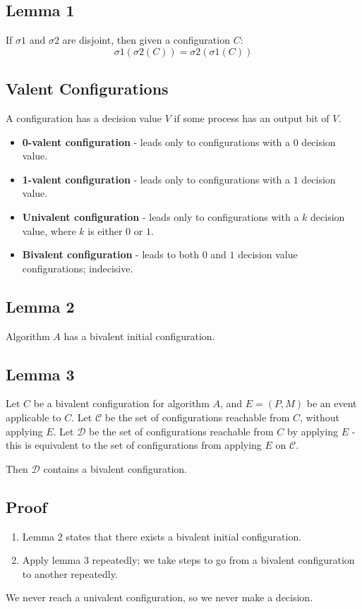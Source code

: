 \documentclass[11pt]{article}
\begin{document}
\subsection{Lemma 1}
If $\sigma1$ and $\sigma2$ are disjoint, then given a configuration $C$:
\[
  \sigma1(\sigma2(C)) = \sigma2(\sigma1(C)) 
\]

\subsection{Valent Configurations}
A configuration has a decision value $V$ if some process has an output bit of $V$.
\begin{itemize}
  \item \textbf{0-valent configuration} - leads only to configurations with a $0$ decision value.
  \item \textbf{1-valent configuration} - leads only to configurations with a $1$ decision value.
  \item \textbf{Univalent configuration} - leads only to configurations with a $k$ decision value, where $k$ is either $0$ or $1$.
  \item \textbf{Bivalent configuration} - leads to both $0$ and $1$ decision value configurations; indecisive.
\end{itemize}

\subsection{Lemma 2}
Algorithm $A$ has a bivalent initial configuration.

\subsection{Lemma 3}
Let $C$ be a bivalent configuration for algorithm $A$, and $E = (P, M)$ be an event applicable to $C$.
Let $\mathcal{C}$ be the set of configurations reachable from $C$, without applying $E$.
Let $\mathcal{D}$ be the set of configurations reachable from $C$ by applying $E$ - this is equivalent to the set of configurations from applying $E$ on $\mathcal{C}$.

Then $\mathcal{D}$ contains a bivalent configuration.

\subsection{Proof}
\begin{enumerate}
  \item Lemma 2 states that there exists a bivalent initial configuration.
  \item Apply lemma 3 repeatedly; we take steps to go from a bivalent configuration to another repeatedly.
\end{enumerate}
We never reach a univalent configuration, so we never make a decision.
\end{document}
